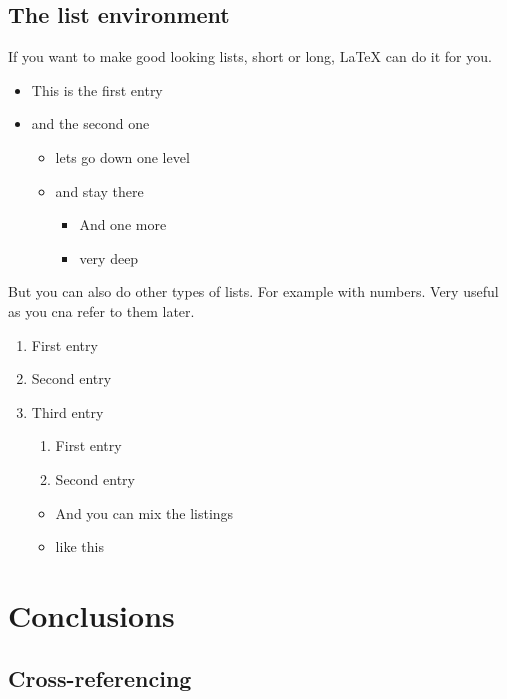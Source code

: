\documentclass[12pt]{report}
\begin{document}
\section{The list environment}

If you want to make good looking lists, short or long, LaTeX can do it for you.

\begin{itemize}
\item This is the first entry
\item and the second one
  \begin{itemize}
    \item lets go down one level
    \item and stay there
      \begin{itemize}
          \item And one more
          \item very deep
      \end{itemize}
  \end{itemize}
\end{itemize}

But you can also do other types of lists. For example with numbers. Very useful
as you cna refer to them later.

\begin{enumerate}
  \item First entry
  \item Second entry
  \item Third entry
    \begin{enumerate} 
  \item First entry \label{label:item}
  \item Second entry
  \end{enumerate}
      \begin{itemize}
          \item And you can mix the listings
          \item like this 
      \end{itemize}
\end{enumerate}     

\chapter{Conclusions}

\section{Cross-referencing}
\end{document}
